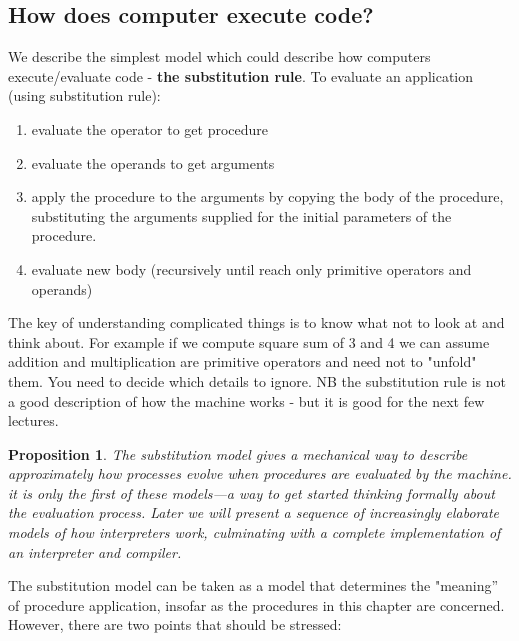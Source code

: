 \documentclass[a4paper,twoside]{article}
\newtheorem{proposition}[theorem]{Proposition}
\numberwithin{equation}{section}
\begin{document}
\subsection{How does computer execute code?}
We describe the simplest model which could describe how computers execute/evaluate code - \textbf{the substitution rule}. To evaluate an application (using substitution rule):
\begin{enumerate}
    \item evaluate the operator to get procedure
    \item evaluate the operands to get arguments
    \item apply the procedure to the arguments by copying the body of the procedure, substituting
          the arguments supplied for the initial parameters of the procedure.
    \item evaluate new body (recursively until reach only primitive operators and operands)
\end{enumerate}
The key of understanding complicated things is to know what not to look at and think about. For
example if we compute square sum of 3 and 4 we can assume addition and multiplication are primitive
operators and need not to "unfold" them. You need to decide which details to ignore. NB the substitution rule is not a good description of how the machine works - but it is good for the next few lectures.
\begin{proposition}
    The substitution model gives a mechanical way to describe approximately how processes evolve when
    procedures are evaluated by the machine. it is only the first of these
    models—a way to get started thinking formally about the evaluation process. Later we will present
    a sequence of increasingly elaborate models of how interpreters work, culminating with a complete
    implementation of an interpreter and compiler.
\end{proposition}
The substitution model can be taken as a model that determines the
"meaning” of procedure application, insofar as the procedures in this
chapter are concerned. However, there are two points that should be
stressed:
\end{document}
